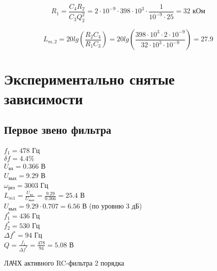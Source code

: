 \begin{displaymath}
	R_1 = \frac{C_4 R_2}{C_3 Q_2^2} = 2 \cdot 10^{-9} \cdot 398 \cdot 10^3 \cdot \frac{1}{10^{-9} \cdot 25} = 32 \text{ кОм}
\end{displaymath}

\begin{displaymath}
	L_{m,2} = 20 lg \left( \frac{R_2 C_4}{R_1 C_3} \right) = 20 lg \left( \frac{398 \cdot 10^3 \cdot 2 \cdot 10^{-9}}{32 \cdot 10^3 \cdot 10^{-9}} \right) = 27.9
\end{displaymath}

\section{Экспериментально снятые зависимости}

\subsection{Первое звено фильтра}

\noindent $f_1 = 478$ Гц \\
$\delta f = 4.4 \%$ \\
$U_\text{вх} = 0.366$ В \\
$U_\text{вых} = 9.29$ В \\
$\omega_\text{рез} = 3003$ Гц \\
$L_{m1} = \frac{U_{\text{вх}}}{U_{\text{вых}}} = \frac{9.29}{0.366} = 25.4$ В \\
$U_{\text{вых}} = 9.29 \cdot 0.707 = 6.56$ В (по уровню 3 дБ)\\
$f_1^* = 436$ Гц \\
$f_2^* = 530$ Гц \\
$\Delta f^* = 94$ Гц \\
$Q = \frac{f_1}{\Delta f^*} = \frac{478}{94} = 5.08$ В \\

\begin{table}[H]
\begin{center}
	\caption{ЛАЧХ активного RC-фильтра 2 порядка}
	\label{tab:diff-int}
	\def\tabcolsep{20pt}
\end{center}
\end{table}

